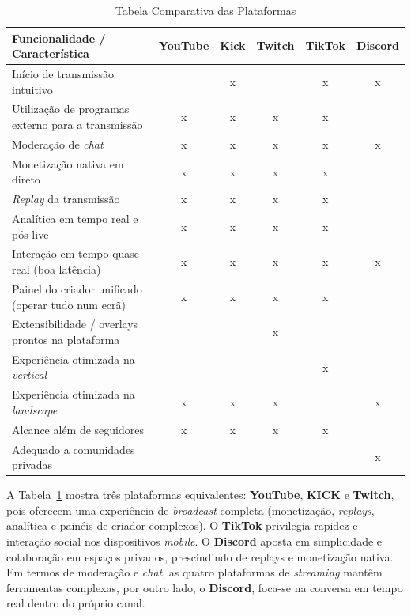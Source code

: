 \begin{table}[H]
\caption{Tabela Comparativa das Plataformas}
\label{tab:comparacao-plataformas}
\begin{center}
\begin{tabular}{|p{5.5cm}|c|c|c|c|c|}
\hline
\textbf{Funcionalidade / Característica} &
\textbf{YouTube} &
\textbf{Kick} &
\textbf{Twitch} &
\textbf{TikTok} &
\textbf{Discord} \\
\hline
Início de transmissão intuitivo                           &   & x &   & x & x \\
\hline
Utilização de programas externo para a transmissão        & x & x & x & x &   \\
\hline
Moderação de \textit{chat}                                & x & x & x & x & x \\
\hline
Monetização nativa em direto                              & x & x & x & x &   \\
\hline
\textit{Replay} da transmissão                            & x & x & x & x &   \\
\hline
Analítica em tempo real e pós-live                        & x & x & x & x &   \\
\hline
Interação em tempo quase real (boa latência)              & x & x & x & x & x \\
\hline
Painel do criador unificado (operar tudo num ecrã)        & x & x & x & x &   \\
\hline
Extensibilidade / overlays prontos na plataforma          &   &   & x &   &   \\
\hline
Experiência otimizada na \textit{vertical}                &   &   &   & x &   \\
\hline
Experiência otimizada na \textit{landscape}               & x & x & x &  & x  \\
\hline
Alcance além de seguidores                                & x & x & x & x &   \\
\hline
Adequado a comunidades privadas                           &   &   &   &   & x \\
\hline
\end{tabular}
\end{center}
\end{table}


A Tabela~\ref{tab:comparacao-plataformas} mostra três plataformas equivalentes: \textbf{YouTube}, \textbf{KICK} e \textbf{Twitch}, pois oferecem uma experiência de \textit{broadcast} completa (monetização, \textit{replays}, analítica e painéis de criador complexos). O \textbf{TikTok} privilegia rapidez e interação social nos dispositivos \textit{mobile}. O \textbf{Discord} aposta em simplicidade e colaboração em espaços privados, prescindindo de replays e monetização nativa. Em termos de moderação e \textit{chat}, as quatro plataformas de \textit{streaming} mantêm ferramentas complexas, por outro lado, o \textbf{Discord}, foca-se na conversa em tempo real dentro do próprio canal.


